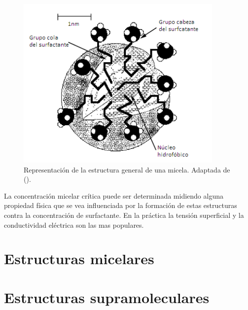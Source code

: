 \begin{figure}
    \centering
    \includegraphics[width=0.9\textwidth]{Graphics/micela.png}
    \caption[Estructura general de una micela]{Representación de la estructura general de una micela. Adaptada de (\cite{Pashley}). }
    \label{fig:micela}
\end{figure}

La concentración micelar crítica puede ser determinada midiendo alguna propiedad física que se vea influenciada por la formación de estas estructuras contra la concentración de surfactante. En la práctica la tensión superficial y la conductividad eléctrica son las mas populares.

\section{Estructuras micelares}

\section{Estructuras supramoleculares}

